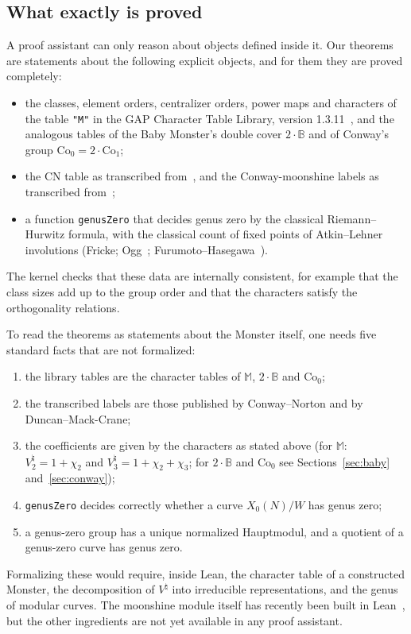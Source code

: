 \documentclass[11pt]{amsart}
\theoremstyle{definition}
\newcommand{\M}{\mathbb{M}}
\newcommand{\BB}{\mathbb{B}}
\newcommand{\lean}[1]{\textnormal{\texttt{#1}}}
\begin{document}
\subsection{What exactly is proved}\label{sec:scope}
A proof assistant can only reason about objects defined inside it. Our theorems are statements about the following explicit objects, and for them they are proved completely:
\begin{itemize}
\item the classes, element orders, centralizer orders, power maps and characters of the table \texttt{"M"} in the GAP Character Table Library, version 1.3.11~\cite{CTblLib}, and the analogous tables of the Baby Monster's double cover $2\cdot\BB$ and of Conway's group $\mathrm{Co}_0=2\cdot\mathrm{Co}_1$;
\item the CN table as transcribed from~\cite[App.~A]{DGO}, and the Conway-moonshine labels as transcribed from~\cite[Table~A.1]{DMC15};
\item a function \lean{genusZero} that decides genus zero by the classical Riemann--Hurwitz formula, with the classical count of fixed points of Atkin--Lehner involutions (Fricke; Ogg~\cite{Ogg74}; Furumoto--Hasegawa~\cite{FH99}).
\end{itemize}
The kernel checks that these data are internally consistent, for example that the class sizes add up to the group order and that the characters satisfy the orthogonality relations.

To read the theorems as statements about the Monster itself, one needs five standard facts that are not formalized:
\begin{enumerate}
\item[(A1)] the library tables are the character tables of $\M$, $2\cdot\BB$ and $\mathrm{Co}_0$;
\item[(A2)] the transcribed labels are those published by Conway--Norton and by Duncan--Mack-Crane;
\item[(A3)] the coefficients are given by the characters as stated above (for $\M$: $V^\natural_2=1+\chi_2$ and $V^\natural_3=1+\chi_2+\chi_3$; for $2\cdot\BB$ and $\mathrm{Co}_0$ see Sections~\ref{sec:baby} and~\ref{sec:conway});
\item[(A4)] \lean{genusZero} decides correctly whether a curve $X_0(N)/W$ has genus zero;
\item[(A5)] a genus-zero group has a unique normalized Hauptmodul, and a quotient of a genus-zero curve has genus zero.
\end{enumerate}
Formalizing these would require, inside Lean, the character table of a constructed Monster, the decomposition of $V^\natural$ into irreducible representations, and the genus of modular curves. The moonshine module itself has recently been built in Lean~\cite{PopovVOA}, but the other ingredients are not yet available in any proof assistant.
\end{document}
